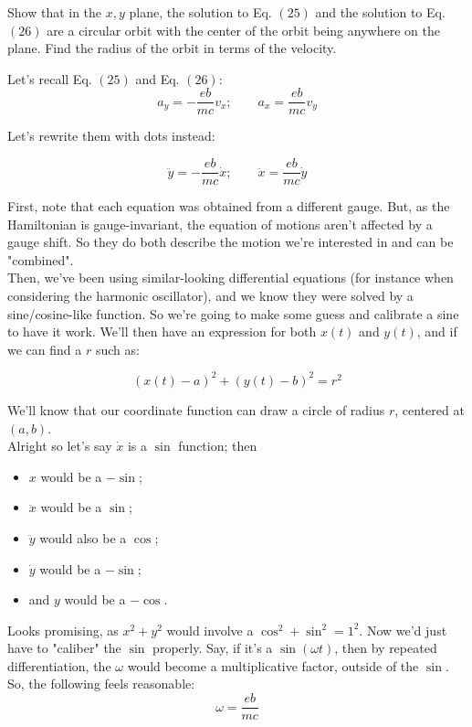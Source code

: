\documentclass[solutions.tex]{subfiles}
\begin{document}
\maketitle
\begin{exercise}
Show that in the $x, y$ plane, the solution to Eq. $(25)$
and the solution to Eq. $(26)$ are a circular orbit with the
center of the orbit being anywhere on the plane. Find the radius
of the orbit in terms of the velocity.
\end{exercise}

Let's recall Eq. $(25)$ and Eq. $(26)$:
\[
	a_y = -\frac{eb}{mc}v_x;\qquad
	a_x = \frac{eb}{mc}v_y
\]

Let's rewrite them with dots instead:

\[
	\ddot{y} = -\frac{eb}{mc}\dot{x};\qquad
	\ddot{x} = \frac{eb}{mc}\dot{y}
\]

First, note that each equation was obtained from a different gauge.
But, as the Hamiltonian is gauge-invariant, the equation of motions
aren't affected by a gauge shift. So they do both describe the
motion we're interested in and can be "combined". \\

Then, we've been using similar-looking differential equations (for
instance when considering the harmonic oscillator), and we know they
were solved by a sine/cosine-like function. So we're going to make
some guess and calibrate a sine to have it work. We'll then have
an expression for both $x(t)$ and $y(t)$, and if we can find a $r$
such as:

\[
	(x(t)-a)^2 + (y(t)-b)^2 = r^2
\]

We'll know that our coordinate function can draw a circle of radius $r$,
centered at $(a, b)$. \\

Alright so let's say $\dot{x}$ is a $\sin$ function; then

\begin{itemize}
	\item $x$ would be a $-\sin$;
	\item $\ddot{x}$ would be a $\sin$;
	\item $\ddot{y}$ would also be a $\cos$;
	\item $\dot{y}$ would be a $-\sin$;
	\item and $y$ would be a $-\cos$.
\end{itemize}

Looks promising, as $x^2+y^2$ would involve a $\cos^2+\sin^2=1^2$.
Now we'd just have to "caliber" the $\sin$ properly. Say, if it's
a $\sin(\omega t)$, then by repeated differentiation, the $\omega$
would become a multiplicative factor, outside of the $\sin$. So,
the following feels reasonable:
\[
	\omega = \frac{eb}{mc}
\]
\end{document}
